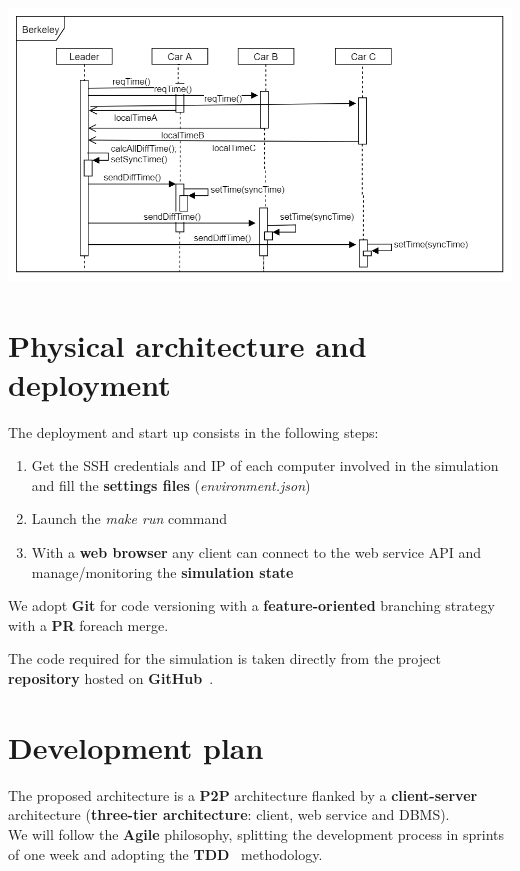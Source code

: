 \begin{center}
    \includegraphics[scale=0.6, width=\linewidth]{assets/berkeley.png}
\end{center}

\section{Physical architecture and deployment}

The deployment and start up consists in the following steps:
\begin{enumerate}
    \item Get the SSH credentials and IP of each computer involved in the simulation and 
        fill the \textbf{settings files} (\textit{environment.json})
    \item Launch the \textit{make run} command 
    \item With a \textbf{web browser} any client can connect to the web service API and 
        manage/monitoring the \textbf{simulation state}   
\end{enumerate}

We adopt \textbf{Git} for code versioning with a \textbf{feature-oriented} 
branching strategy with a \textbf{PR} foreach merge.

The code required for the simulation is taken directly from the project 
\textbf{repository} hosted on \textbf{GitHub}~\cite{2}.


\section{Development plan}

The proposed architecture is a \textbf{P2P} architecture flanked by a 
\textbf{client-server} architecture (\textbf{three-tier architecture}: 
client, web service and DBMS).\\

We will follow the \textbf{Agile} philosophy, splitting the development process in sprints 
of one week and adopting the \textbf{TDD}~\cite{10} methodology.
